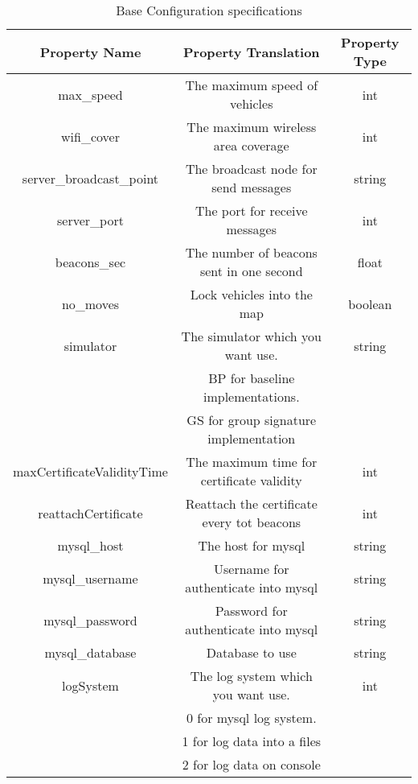\begin{table}[!ht]
	\centering
	\caption{Base Configuration specifications}
	\begin{tabular}{|c|c|c|}
	\hline\hline 
	\textbf{Property Name} & \textbf{Property Translation} & \textbf{Property Type} \\
	\hline
	max\_speed & The maximum speed of vehicles & int \\
	\hline
	wifi\_cover & The maximum wireless area coverage & int \\
	\hline
	server\_broadcast\_point & The broadcast node for send messages & string \\
	\hline
	server\_port & The port for receive messages & int \\
	\hline
	beacons\_sec & The number of beacons sent in one second & float \\
	\hline
	no\_moves & Lock vehicles into the map & boolean \\
	\hline
	simulator & The simulator which you want use. & string\\
	{} & BP for baseline implementations. & {} \\
	{} & GS for group signature implementation & {} \\
	\hline
	maxCertificateValidityTime & The maximum time for certificate validity & int \\
	\hline
	reattachCertificate & Reattach the certificate every tot beacons & int \\
	\hline
	mysql\_host & The host for mysql & string \\
	\hline
	mysql\_username & Username for authenticate into mysql & string \\
	\hline
	mysql\_password & Password for authenticate into mysql & string \\
	\hline
	mysql\_database & Database to use & string \\
	\hline
	logSystem & The log system which you want use. & int\\
	{} & 0 for mysql log system. & {} \\
	{} & 1 for log data into a files & {} \\
	{} & 2 for log data on console & {} \\
	\hline
	\hline     %
 	\end{tabular} 
	\label{tab:BaseConfiguration}
\end{table}
